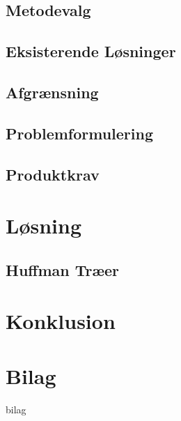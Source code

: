 \documentclass[12pt]{report}
\begin{document}
	\section{Metodevalg}
	

	\section{Eksisterende Løsninger}
	

	\section{Afgrænsning}
	

	\section{Problemformulering}
		
	
	\section{Produktkrav}
	
	



\chapter{Løsning}

	\section{Huffman Træer}
	

\chapter{Konklusion}






\chapter*{Bilag}
 {bilag}
\end{document}
